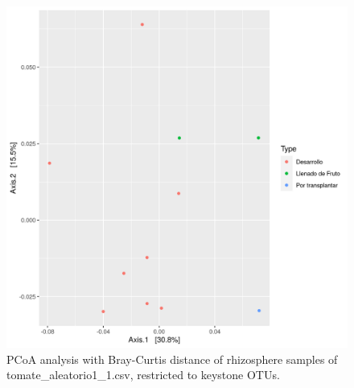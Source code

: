 \begin{figure}
  \centering
  \includegraphics[scale = 0.7]{pcoa_key_otus_tomate_aleatorio1_1.csv.png}
  \caption{PCoA analysis with Bray-Curtis distance of rhizosphere samples of tomate_aleatorio1_1.csv, restricted to keystone OTUs.}
  \label{fig:tomate_aleatorio1_1.csv_pcoa_key_otus}
\end{figure}
